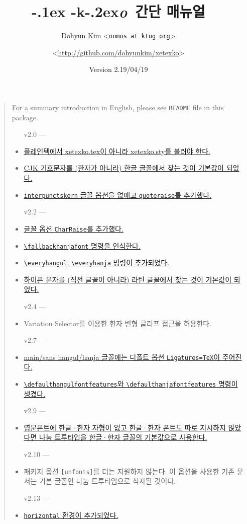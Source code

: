 \documentclass[a4paper]{article}
\def\logoko{\textsf{k}\kern-.2ex\textit{o}}
\def\XeTeX{\hologo{XeTeX}}
\def\xetexko{\XeTeX\kern-.1ex -\logoko}
\def\cs#1{\texttt{\textbackslash #1}}
\def\hparen#1{{\small\hangulparens(#1)}}
\begin{document}
\title{\xetexko\ 간단 매뉴얼}
\author{Dohyun Kim \normalsize <\texttt{nomos at ktug org}> \and
  \normalsize <\url{http://github.com/dohyunkim/xetexko}>}
\date{Version 2.19/04/19}
\maketitle

\begin{quote}\small
  For a summary introduction in English,
  please see \verb+README+ file in this package.

  \begin{itemize}\itemsep=0pt\linespread{1.2}\selectfont
    \item[v2.0]---
    \item \hyperref[sec:loading]
      {플레인텍에서 xetexko.tex이 아니라 xetexko.sty를 불러야 한다.}
    \item \hyperref[sec:symbolfont]
      {CJK 기호문자를 \hparen{한자가 아니라} 한글 글꼴에서 찾는 것이
      기본값이 되었다.}
    \item \hyperref[sec:fontopts]
      {\texttt{interpunctskern} 글꼴 옵션을 없애고 \texttt{quoteraise}를
      추가했다.}
    \item[v2.2]---
    \item \hyperref[sec:fontopts]
      {글꼴 옵션 \texttt{CharRaise}를 추가했다.}
    \item \hyperref[sec:fontcmds]
      {\cs{fallbackhanjafont} 명령을 인식한다.}
    \item \hyperref[sec:etccmds]
      {\cs{everyhangul}, \cs{everyhanja} 명령이 추가되었다.}
    \item \hyperref[sec:symbolfont]
      {하이픈 문자를 \hparen{직전 글꼴이 아니라} 라틴 글꼴에서 찾는
      것이 기본값이 되었다.}
    \item[v2.4]---
    \item Variation Selector를 이용한 한자 변형 글리프 접근을 허용한다.
    \item[v2.7]---
    \item \hyperref[sec:fontcmds]
      {main/sans hangul/hanja 글꼴에는 디폴트 옵션
      \texttt{Ligatures=TeX}이 주어진다.}
    \item \hyperref[sec:fontopts]
      {\cs{defaulthangulfontfeatures}와 \cs{defaulthanjafontfeatures}
      명령이 생겼다.}
    \item[v2.9]---
    \item \hyperref[sec:fontcmds]
      {영문폰트에 한글·한자 자형이 없고 한글·한자 폰트도 따로 지시하지 않았다면
      나눔 트루타입을 한글·한자 글꼴의 기본값으로 사용한다.}
    \item[v2.10]---
    \item 패키지 옵션 \texttt{[unfonts]}를 더는 지원하지 않는다. 이 옵션을
      사용한 기존 문서는 기본 글꼴인 나눔 트루타입으로 식자될 것이다.
    \item[v2.13]---
    \item \hyperref[sec:verttype]
      {\texttt{horizontal} 환경이 추가되었다.}
  \end{itemize}
\end{quote}
\end{document}
